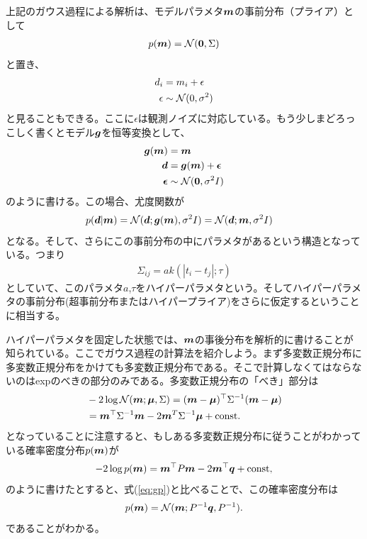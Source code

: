 上記のガウス過程による解析は、モデルパラメタ$\boldsymbol{m}$の事前分布（プライア）として
\begin{align}
p(\boldsymbol{m}) = \mathcal{N} (\boldsymbol{0},\Sigma)
\end{align}
と置き、
\begin{align}
d_i &= m_i + \epsilon \\
\epsilon &\sim \mathcal{N} (0,\sigma^2)
\end{align}
と見ることもできる。ここに$\epsilon$は観測ノイズに対応している。もう少しまどろっこしく書くとモデル$\boldsymbol{g}$を恒等変換として、
\begin{align}
\label{eq:identif}
\boldsymbol{g}(\boldsymbol{m}) &= \boldsymbol{m} \\
\boldsymbol{d} &= \boldsymbol{g}(\boldsymbol{m}) + \boldsymbol{\epsilon} \\
\boldsymbol{\epsilon} &\sim \mathcal{N} (\boldsymbol{0} ,\sigma^2 I)
\end{align}
のように書ける。この場合、尤度関数が
\begin{align}
p(\boldsymbol{d}|\boldsymbol{m}) &= \mathcal{N} (\boldsymbol{d};\boldsymbol{g}(\boldsymbol{m}),\sigma^2 I) = \mathcal{N} (\boldsymbol{d};\boldsymbol{m},\sigma^2 I)
\end{align}
となる。そして、さらにこの事前分布の中にパラメタがあるという構造となっている。つまり
\begin{align}
\Sigma_{ij} = a k(|t_i-t_j|;\tau) 
\end{align}
としていて、このパラメタ$a$,$\tau$をハイパーパラメタという。そしてハイパーパラメタの事前分布(超事前分布またはハイパープライア)をさらに仮定するということに相当する。



ハイパーパラメタを固定した状態では、$\boldsymbol{m}$の事後分布を解析的に書けることが知られている。ここでガウス過程の計算法を紹介しよう。まず多変数正規分布に多変数正規分布をかけても多変数正規分布である。そこで計算しなくてはならないのはexpのべきの部分のみである。多変数正規分布の「べき」部分は
\begin{align}
\label{eq:gp}
&- 2 \log{ \mathcal{N}(\boldsymbol{m};\boldsymbol{\mu}, \Sigma) } = (\boldsymbol{m} - \boldsymbol{\mu})^\top \Sigma^{-1} (\boldsymbol{m} - \boldsymbol{\mu}) \nonumber \\
&= \boldsymbol{m}^\top \Sigma^{-1} \boldsymbol{m} - 2 \boldsymbol{m}^T \Sigma^{-1} \boldsymbol{\mu} + \mathrm{const}. 
\end{align}
となっていることに注意すると、もしある多変数正規分布に従うことがわかっている確率密度分布$p(\boldsymbol{m})$が
\begin{align}
\label{eq:gpqu}
- 2 \log{ p(\boldsymbol{m}) } = \boldsymbol{m}^\top P \boldsymbol{m} - 2 \boldsymbol{m}^\top \boldsymbol{q} + \mathrm{const},
\end{align}
のように書けたとすると、式(\ref{eq:gp})と比べることで、この確率密度分布は
\begin{align}
\label{eq:gpqusol}
p(\boldsymbol{m}) = \mathcal{N}(\boldsymbol{m}; P^{-1} \boldsymbol{q} ,P^{-1}).
\end{align}
であることがわかる。

